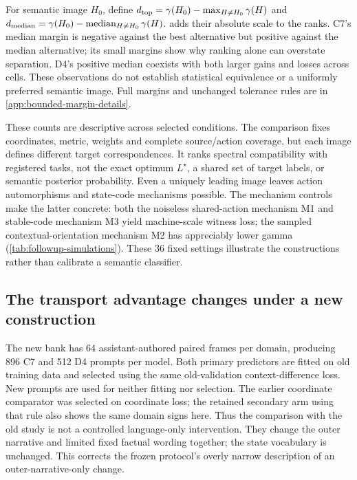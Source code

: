 \begin{table}[t]
\centering\small

\caption{Absolute spectral-budget margins of the specified image against the strongest and median alternatives, excluding that image itself. Summaries use all \BoundedCellsPerDomain{} cells per domain. U/T/B counts unique leading, tied leading and behind under the original pairwise tolerance. Raw margins retain their signs; they are not permutation $p$-values, exact-action risk rankings or probabilities of semantic correctness.}
\label{tab:bounded-margins}
\end{table}
For semantic image $H_0$, define $d_{\rm top}=\gamma(H_0)-\max_{H\ne H_0}\gamma(H)$ and $d_{\rm median}=\gamma(H_0)-\operatorname{median}_{H\ne H_0}\gamma(H)$.  adds their absolute scale to the ranks. C7's median margin is negative against the best alternative but positive against the median alternative; its small margins show why ranking alone can overstate separation. D4's positive median coexists with both larger gains and losses across cells. These observations do not establish statistical equivalence or a uniformly preferred semantic image. Full margins and unchanged tolerance rules are in \cref{app:bounded-margin-details}.

These counts are descriptive across selected conditions. The comparison fixes coordinates, metric, weights and complete source/action coverage, but each image defines different target correspondences. It ranks spectral compatibility with registered tasks, not the exact optimum $L^\star$, a shared set of target labels, or semantic posterior probability. Even a uniquely leading image leaves action automorphisms and state-code mechanisms possible. The mechanism controls make the latter concrete: both the noiseless shared-action mechanism M1 and stable-code mechanism M3 yield machine-scale witness loss; the sampled contextual-orientation mechanism M2 has appreciably lower gamma (\cref{tab:followup-simulations}). These 36 fixed settings illustrate the constructions rather than calibrate a semantic classifier.

\subsection{The transport advantage changes under a new construction}

The new bank has 64 assistant-authored paired frames per domain, producing 896 C7 and 512 D4 prompts per model. Both primary predictors are fitted on old training data and selected using the same old-validation context-difference loss. New prompts are used for neither fitting nor selection. The earlier coordinate comparator was selected on coordinate loss; the retained secondary arm using that rule also shows the same domain signs here. Thus the comparison with the old study is not a controlled language-only intervention. They change the outer narrative and limited fixed factual wording together; the state vocabulary is unchanged. This corrects the frozen protocol's overly narrow description of an outer-narrative-only change.

